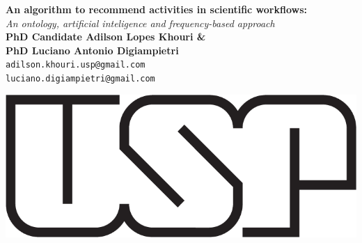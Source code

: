 \documentclass[ a0, portrait]{a0poster}
\begin{document}


\begin{minipage}[b]{0.8\linewidth}
\veryHuge \color{NavyBlue} \textbf{An algorithm to recommend activities in scientific workflows:} \color{Black}\\ %
\Huge\textit{An ontology, artificial inteligence and frequency-based approach}\\[2cm] %
\huge \textbf{PhD Candidate Adilson Lopes Khouri \& \\  PhD Luciano Antonio Digiampietri}\\[0.5cm] %
\Large \texttt{adilson.khouri.usp@gmail.com} \\
\Large \texttt{luciano.digiampietri@gmail.com}
\end{minipage}
\begin{minipage}[b]{0.20\linewidth}
\includegraphics[width=15cm]{usp.png}\\
\end{minipage}

\vspace{1cm} %

\end{document}
